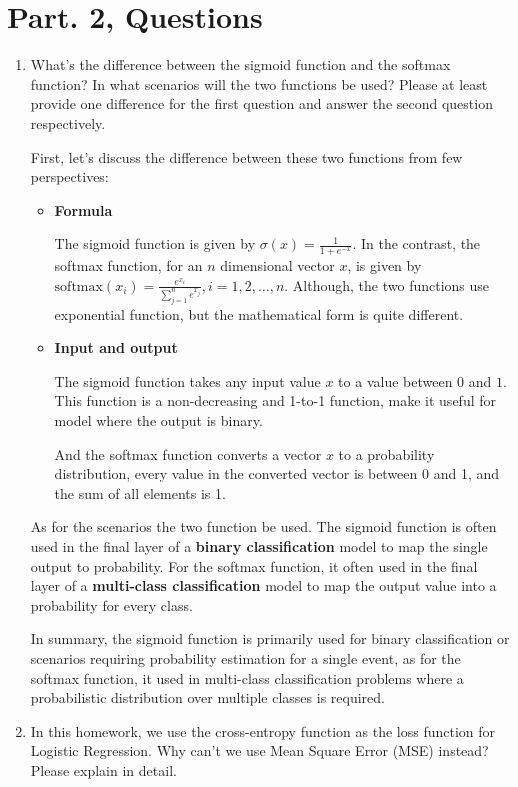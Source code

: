 \documentclass[twocolumn]{extarticle}
\begin{document}
\section{Part. 2, Questions}
\begin{enumerate}
\item What's the difference between the sigmoid function and the softmax function? In what scenarios will the two functions be used? Please at least provide one difference for the first question and answer the second question respectively.

First, let's discuss the difference between these two functions from few perspectives:

\begin{itemize}
\item \textbf{Formula}

The sigmoid function is given by $\sigma(x)=\frac{1}{1+e^{-x}}$. In the contrast, the softmax function, for an $n$ dimensional vector $x$, is given by $\text{softmax}(x_i)=\frac{e^{x_i}}{\sum_{j=1}^{n}e^{x_j}}, i=1,2,\dots,n$. Although, the two functions use exponential function, but the mathematical form is quite different.

\item \textbf{Input and output}

The sigmoid function takes any input value $x$ to a value between $0$ and $1$. This function is a non-decreasing and 1-to-1 function, make it useful for model where the output is binary.

And the softmax function converts a vector $x$ to a probability distribution, every value in the converted vector is between 0 and 1, and the sum of all elements is 1.

\end{itemize}

As for the scenarios the two function be used. The sigmoid function is often used in the final layer of a \textbf{binary classification} model to map the single output to probability. For the softmax function, it often used in the final layer of a \textbf{multi-class classification} model to map the output value into a probability for every class.

In summary, the sigmoid function is primarily used for binary classification or scenarios requiring probability estimation for a single event, as for the softmax function, it used in multi-class classification problems where a probabilistic distribution over multiple classes is required.

\item In this homework, we use the cross-entropy function as the loss function for Logistic Regression. Why can't we use Mean Square Error (MSE) instead? Please explain in detail.


\end{enumerate}
\end{document}
